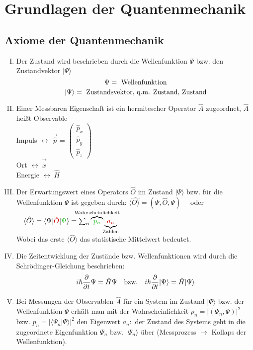 
\chapter{Grundlagen der Quantenmechanik}


\section{Axiome der Quantenmechanik}

\begin{enumerate}[I)]
	\item Der Zustand wird beschrieben durch die Wellenfunktion $ \Psi $ bzw. den Zustandvektor $ |\Psi \rangle $\\
	$$ \Psi = \textrm{ Wellenfunktion}$$
	$$ \vert\Psi\rangle = \textrm{ Zustandsvektor, q.m. Zustand, Zustand}$$
	\item Einer Messbaren Eigenschaft ist ein hermitescher Operator $ \hat{A} $ zugeordnet, $ \hat{A} $ heißt Observable\\
	Impuls $\leftrightarrow$ $\vec{\hat p}$ = $\begin{pmatrix} \hat p_x \\ \hat p_y \\ \hat p_z \end{pmatrix}$\\
	Ort $\leftrightarrow\ \vec{\hat x}$\\
	Energie $\leftrightarrow\ \hat H$
	\item Der Erwartungswert eines Operators $ \hat{O} $ im Zustand $ |\Psi\rangle $ bzw. für die Wellenfunktion $ \Psi $ ist gegeben durch:
	 $ \langle \hat{ O \rangle} = (\Psi, \hat{O}, \Psi) \quad $ oder $ \quad \langle \hat O \rangle = \langle \Psi \vert \color{black!20!red}\hat O \color{black}\vert \color{black!30!green} \Psi \color{black}\rangle = \sum_n \overbrace{\color{black!30!green}p_n}^{\mathclap{\tx{Wahrscheinlichkeit}}} \underbrace{\color{black!20!red}a_n}_{\mathclap{\tx{Zahlen}}}$\\
	Wobei das erste $\langle \hat O \rangle$ das statistische Mittelwert bedeutet. \\
	\item Die Zeitentwicklung der Zustände bzw. Wellenfunktionen wird durch die Schrödinger-Gleichung beschrieben:\\
	$$ i\hbar \frac{\partial}{\partial t}\Psi = \hat{H}\Psi \quad \textrm{bzw.} \quad i\hbar \frac{\partial}{\partial t} | \Psi \rangle = \hat{H}|\Psi \rangle$$
	\item Bei Messungen der Observablen $ \hat{A} $ für ein System im Zustand $ |\Psi \rangle $ bzw. der Wellenfunktion $ \Psi $ erhält man mit der Wahrscheinlichkeit $ p_n = |(\Psi_n, \Psi)|^2 $ bzw. $ p_n = |\langle \Psi_n | \Psi \rangle |^2 $ den Eigenwert $ a_n : $ der Zustand des Systems geht in die zugeordnete Eigenfunktion $ \Psi_n $ bzw. $ |\Psi_n\rangle $ über (Messprozess $ \rightarrow $ Kollaps der Wellenfunktion). \label{Axiom5}
\end{enumerate}
